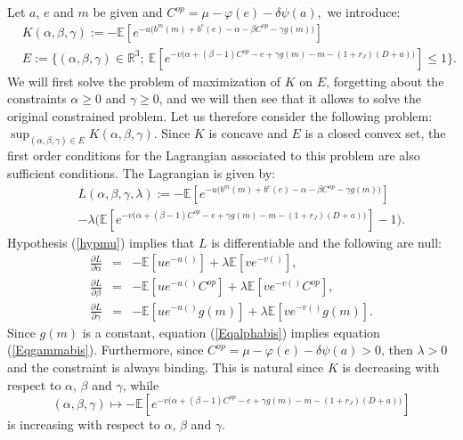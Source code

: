 \documentclass{svjour3}
\begin{document}
Let $a$, $e$ and $m$  be given and $C^{op}=\mu-\varphi(e)-\delta\psi(a),$ we introduce:
\begin{eqnarray*}
&K(\alpha,\beta,\gamma):=-\mathbb{E}\left[e^{-u\big(b^m(m)+b^e(e)-\alpha-\beta C^{op}-\gamma{g}(m)\big)}\right]
\\
&E:=\Big\{(\alpha,\beta,\gamma)\in\mathbb{R}^3;~\mathbb{E}\left[e^{-v\big(\alpha+(\beta-1)C^{op}-e+\gamma{g}(m)-m -(1+r_J)(D+a)\big)}\right]\leq 1\Big\}.
\end{eqnarray*}
We will first solve the problem of maximization of $K$ on $E$, forgetting about the constraints $\alpha\geq 0$ and $\gamma\geq 0$, and we will then see that it allows to solve the original constrained problem. Let us therefore consider the following problem: $\sup_{(\alpha,\beta,\gamma)\in E}K(\alpha,\beta,\gamma)$. Since $K$ is concave and $E$ is a closed convex set, the first order conditions for the Lagrangian associated to this problem are also sufficient conditions. The Lagrangian is given by:
\begin{eqnarray*}
&&L(\alpha,\beta,\gamma,\lambda):=-\mathbb{E}\left[e^{-u\big(b^m(m)+b^e(e)-\alpha-\beta C^{op}-\gamma{g}(m)\big)}\right]
\\
&&-\lambda \Big(\mathbb{E}\left[
e^{-v\big(\alpha+(\beta-1)C^{op}-e+\gamma{g}(m)-m -(1+r_J)(D+a)\big)}\right]-1\Big).
\end{eqnarray*}
Hypothesis (\ref{hypmu}) implies that $L$ is differentiable and  
the following are null:
{\small{
\begin{eqnarray}
\label{Eqalphabis}
\frac{\partial L}{\partial \alpha}&=&-\mathbb{E}\left[u e^{-u()}\right]+
\lambda\mathbb{E}\left[ve^{-v()}\right],
\\
\label{Eqbetabis}
\frac{\partial L}{\partial \beta}&=&-\mathbb{E}\left[u e^{-u()}C^{op}\right]+
\lambda\mathbb{E}\left[ve^{-v()}C^{op}\right],
\\
\label{Eqgammabis}
\frac{\partial L}{\partial \gamma}&=&-\mathbb{E}\left[u e^{-u()}g(m)\right]+
\lambda\mathbb{E}\left[ve^{-v()}g(m)\right].
\end{eqnarray}
}}
\noindent Since $g(m)$ is a constant, equation (\ref{Eqalphabis}) implies equation (\ref{Eqgammabis}).
Furthermore, since
 $C^{op}=\mu-\varphi(e)-\delta\psi(a)>0$,  then $\lambda>0$ and the constraint is always binding. This is natural since $K$ is decreasing with respect to $\alpha$, $\beta$ and $\gamma$, while 
 $$(\alpha,\beta,\gamma)\mapsto -
 \mathbb{E}\left[e^{-v\big(\alpha+(\beta-1)C^{op}-e+\gamma g(m)-m-(1+r_J)(D+a)\big)}\right]$$
  is increasing with respect to $\alpha$, $\beta$ and $\gamma$.
\end{document}
